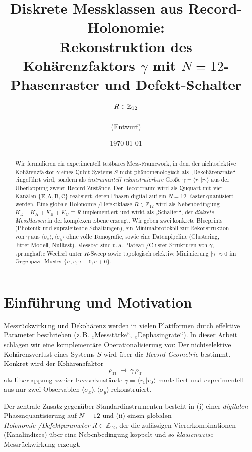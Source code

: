\documentclass[11pt,a4paper]{article}
\title{\textbf{Diskrete Messklassen aus Record-Holonomie:}\\
	\textbf{Rekonstruktion des Kohärenzfaktors $\gamma$ mit $N{=}12$-Phasenraster und Defekt-Schalter $R\in\Z_{12}$}}
\author{(Entwurf)}
\date{\today}
\newcommand{\Z}{\mathbb{Z}}
\newcommand{\EE}{\mathrm{E}}
\newcommand{\AA}{\mathrm{A}}
\newcommand{\BB}{\mathrm{B}}
\newcommand{\CC}{\mathrm{C}}
\begin{document}
	\maketitle
	
	\begin{abstract}
		Wir formulieren ein experimentell testbares Mess-Framework, in dem der nichtselektive Kohärenzfaktor
		$\gamma$ eines Qubit-Systems $S$ nicht phänomenologisch als „Dekohärenzrate“ eingeführt wird, sondern
		als \emph{instrumentell rekonstruierbare} Größe $\gamma=\langle r_1|r_0\rangle$ aus der Überlappung zweier
		Record-Zustände. Der Recordraum wird als Ququart mit vier Kanälen $\{\EE,\AA,\BB,\CC\}$ realisiert, deren
		Phasen digital auf ein $N{=}12$-Raster quantisiert werden. Eine globale Holonomie-/Defektklasse
		$R\in\Z_{12}$ wird als Nebenbedingung $K_\EE+K_\AA+K_\BB+K_\CC\equiv R$ implementiert und wirkt als
		„Schalter“, der \emph{diskrete Messklassen} in der komplexen Ebene erzeugt. Wir geben zwei konkrete
		Blueprints (Photonik und supraleitende Schaltungen), ein Minimalprotokoll zur Rekonstruktion von $\gamma$
		aus $\langle\sigma_x\rangle,\langle\sigma_y\rangle$ ohne volle Tomografie, sowie eine Datenpipeline
		(Clustering, Jitter-Modell, Nulltest). Messbar sind u.\,a. Plateau-/Cluster-Strukturen von $\gamma$,
		sprunghafte Wechsel unter $R$-Sweep sowie topologisch selektive Minimierung $|\gamma|\approx 0$ im
		Gegenpaar-Muster $\{u,v,u{+}6,v{+}6\}$.
	\end{abstract}
	
	\tableofcontents
	
	\section{Einführung und Motivation}
	
	Messrückwirkung und Dekohärenz werden in vielen Plattformen durch effektive Parameter beschrieben
	(z.\,B. „Messstärke“, „Dephasingrate“). In dieser Arbeit schlagen wir eine komplementäre
	Operationalisierung vor: Der nichtselektive Kohärenzverlust eines Systems $S$ wird über die
	\emph{Record-Geometrie} bestimmt. Konkret wird der Kohärenzfaktor
	\[
	\rho_{01}\ \mapsto\ \gamma\,\rho_{01}
	\]
	als Überlappung zweier Recordzustände $\gamma=\langle r_1|r_0\rangle$ modelliert und experimentell aus
	nur zwei Observablen \(\langle\sigma_x\rangle,\langle\sigma_y\rangle\) rekonstruiert.
	
	Der zentrale Zusatz gegenüber Standardinstrumenten besteht in (i) einer \emph{digitalen}
	Phasenquantisierung auf \(N{=}12\) und (ii) einem globalen \emph{Holonomie-/Defektparameter} \(R\in\Z_{12}\),
	der die zulässigen Viererkombinationen (Kanalindizes) über eine Nebenbedingung koppelt und so
	\emph{klassenweise} Messrückwirkung erzeugt.
	
\end{document}
